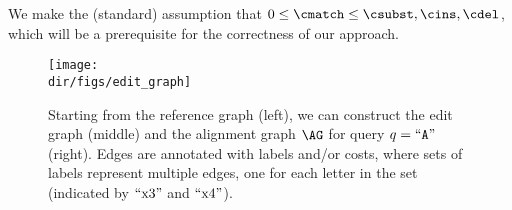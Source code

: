 We make the (standard) assumption that $0 \leq \cmatch \leq \csubst, \cins,
\cdel$, which will be a prerequisite for the correctness of our approach.

\begin{figure}[t]
	\centering
	\texttt{[image: \\dir/figs/edit\_graph]}
	\caption{Starting from the reference graph (left), we can construct the edit graph (middle) and the alignment graph $\AG$ for query $q=``\texttt{A}"$ (right). Edges are annotated with labels and/or costs, where sets of labels represent multiple edges, one for each letter in the set (indicated by $``\text{x}3"$ and $``\text{x}4"$).}
	\label{TRIEfig:graph-constructions}
\end{figure}


